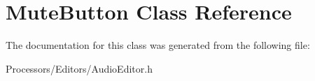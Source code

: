 \hypertarget{classMuteButton}{\section{Mute\-Button Class Reference}
\label{classMuteButton}
}


The documentation for this class was generated from the following file\-:\begin{DoxyCompactItemize}
\item 
Processors/\-Editors/Audio\-Editor.\-h\end{DoxyCompactItemize}

